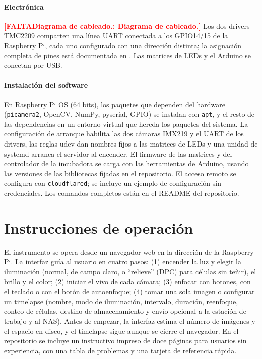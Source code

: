 \documentclass[preprint,12pt]{elsarticle}
\DeclareRobustCommand{\TODO}[1]{\textcolor{red}{\textbf{[FALTA\ifx\relax#1\relax\else: #1\fi]}}}
\begin{document}
\paragraph{Electrónica} \TODO{Diagrama de cableado.} Los dos drivers
TMC2209 comparten una línea UART conectada a los GPIO14/15 de la Raspberry
Pi, cada uno configurado con una dirección distinta; la asignación completa
de pines está documentada en . Las matrices de
LEDs y el Arduino se conectan por USB.

\paragraph{Instalación del software} En Raspberry Pi OS (64 bits), los
paquetes que dependen del hardware (\texttt{picamera2}, OpenCV, NumPy,
pyserial, GPIO) se instalan con \texttt{apt}, y el resto de las
dependencias en un entorno virtual que hereda los paquetes del sistema. La
configuración de arranque habilita las dos cámaras IMX219 y el UART de los
drivers, las reglas udev dan nombres fijos a las matrices de LEDs y una
unidad de systemd arranca el servidor al encender. El firmware de las
matrices y del controlador de la incubadora se carga con las herramientas
de Arduino, usando las versiones de las bibliotecas fijadas en el
repositorio. El acceso remoto se configura con \texttt{cloudflared}; se
incluye un ejemplo de configuración sin credenciales. Los comandos
completos están en el README del repositorio.

\section{Instrucciones de operación}

El instrumento se opera desde un navegador web en la dirección de la
Raspberry Pi. La interfaz guía al usuario en cuatro pasos: (1) encender la
luz y elegir la iluminación (normal, de campo claro, o ``relieve'' (DPC)
para células sin teñir), el brillo y el color; (2) iniciar el vivo de cada
cámara; (3) enfocar con botones, con el teclado o con el botón de
autoenfoque; (4) tomar una sola imagen o configurar un timelapse (nombre,
modo de iluminación, intervalo, duración, reenfoque, conteo de células,
destino de almacenamiento y envío opcional a la estación de trabajo y al
NAS). Antes de empezar, la interfaz estima el número de imágenes y el
espacio en disco, y el timelapse sigue aunque se cierre el navegador. En
el repositorio se incluye un instructivo impreso de doce páginas para
usuarios sin experiencia, con una tabla de problemas y una tarjeta de
referencia rápida.
\end{document}
